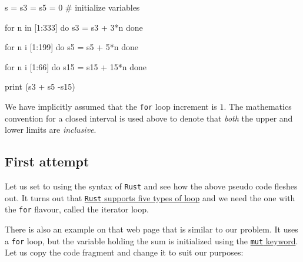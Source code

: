 \documentclass[
  a4paper,
]{article}
\newenvironment{Shaded}{\begin{snugshade}}{\end{snugshade}}
\newcommand{\NormalTok}[1]{\textcolor[rgb]{0.80,0.80,0.80}{#1}}
\begin{document}
\begin{Shaded}
\begin{Highlighting}[]
\NormalTok{s = s3 = s5 = 0 \# initialize variables}

\NormalTok{for n in [1:333]}
\NormalTok{do}
\NormalTok{  s3 = s3 + 3*n}
\NormalTok{done}

\NormalTok{for n i [1:199]}
\NormalTok{do}
\NormalTok{  s5 = s5 + 5*n}
\NormalTok{done}

\NormalTok{for n i [1:66]}
\NormalTok{do}
\NormalTok{  s15 = s15 + 15*n}
\NormalTok{done}

\NormalTok{print (s3 + s5 {-}s15)}
\end{Highlighting}
\end{Shaded}

We have implicitly assumed that the \texttt{for} loop increment is
\(1\). The mathematics convention for a closed interval is used above to
denote that \emph{both} the upper and lower limits are \emph{inclusive}.

\hypertarget{first-attempt}{%
\subsection{First attempt}\label{first-attempt}}

Let us set to using the syntax of \texttt{Rust} and see how the above
pseudo code fleshes out. It turns out that
\href{https://doc.rust-lang.org/reference/expressions/loop-expr.html}{\texttt{Rust}
supports five types of loop} and we need the one with the \texttt{for}
flavour, called the iterator loop.

There is also an example on that web page that is similar to our
problem. It uses a \texttt{for} loop, but the variable holding the sum
is initialized using the
\href{https://doc.rust-lang.org/std/keyword.mut.html}{\texttt{mut}
keyword}. Let us copy the code fragment and change it to suit our
purposes:
\end{document}
